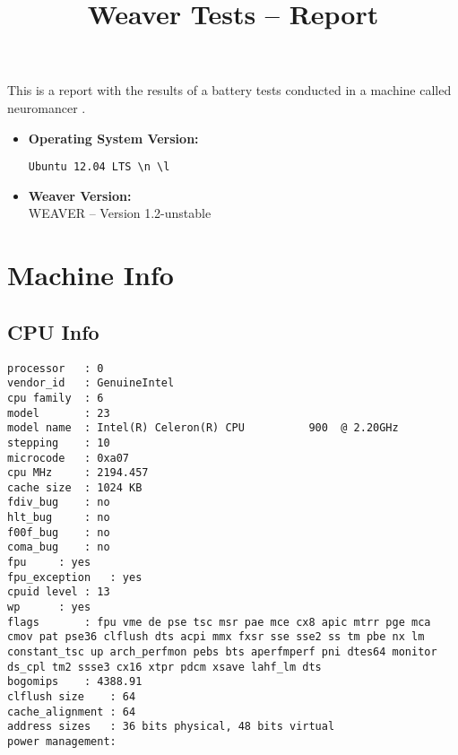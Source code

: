 \documentclass{article}
\title{Weaver Tests -- Report}
\begin{document}
\maketitle
This is a report with the results of a battery
tests conducted in a machine called 
neuromancer
.
\begin{itemize}
\item
\textbf{Operating System Version: }
\begin{verbatim}
Ubuntu 12.04 LTS \n \l

\end{verbatim}
\item
\textbf{Weaver Version: }\\
WEAVER -- Version 1.2-unstable
\end{itemize}
\section{Machine Info}
\subsection{CPU Info}
\begin{verbatim}
processor	: 0
vendor_id	: GenuineIntel
cpu family	: 6
model		: 23
model name	: Intel(R) Celeron(R) CPU          900  @ 2.20GHz
stepping	: 10
microcode	: 0xa07
cpu MHz		: 2194.457
cache size	: 1024 KB
fdiv_bug	: no
hlt_bug		: no
f00f_bug	: no
coma_bug	: no
fpu		: yes
fpu_exception	: yes
cpuid level	: 13
wp		: yes
flags		: fpu vme de pse tsc msr pae mce cx8 apic mtrr pge mca cmov pat pse36 clflush dts acpi mmx fxsr sse sse2 ss tm pbe nx lm constant_tsc up arch_perfmon pebs bts aperfmperf pni dtes64 monitor ds_cpl tm2 ssse3 cx16 xtpr pdcm xsave lahf_lm dts
bogomips	: 4388.91
clflush size	: 64
cache_alignment	: 64
address sizes	: 36 bits physical, 48 bits virtual
power management:

\end{verbatim}
\end{document}
